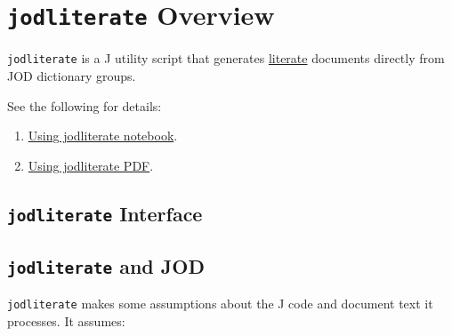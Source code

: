 \section{\texttt{jodliterate} Overview}


\texttt{jodliterate} is a J utility script that generates
\href{https://en.wikipedia.org/wiki/Literate_programming}{literate} documents directly from JOD dictionary groups.

See the following for details:
\begin{enumerate}
\item
 \href{https://github.com/bakerjd99/jacks/blob/master/jodliterate/Using%20jodliterate.ipynb}{Using jodliterate notebook}.
\item
 \href{https://github.com/bakerjd99/jacks/blob/master/jodliterate/UsingJodliterate.pdf}{Using jodliterate PDF}.
\end{enumerate}

\subsection{\texttt{jodliterate} Interface}

\begin{Shaded}
\begin{Highlighting}[]
\hyperlink{THISPANDOC}{}
\hyperlink{grplit}{}
\hyperlink{ifacesection}{}
\hyperlink{setjodliterate}{}
\end{Highlighting}
\end{Shaded}

\subsection{\texttt{jodliterate} and JOD}

\texttt{jodliterate} makes some assumptions about the J code and
document text it processes. It assumes:

